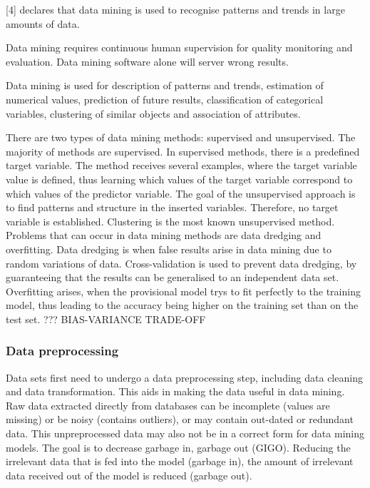 \textcite{DataMiningAndPredictiveAnalytics}[4] declares that data mining is used to recognise patterns and trends in large amounts of data.

Data mining requires continuous human supervision for quality monitoring and evaluation. Data mining software alone will server wrong results.

Data mining is used for description of patterns and trends, estimation of numerical values, prediction of future results, classification of categorical variables, clustering of similar objects and association of attributes.


There are two types of data mining methods: supervised and unsupervised.
The majority of methods are supervised. In supervised methods, there is a predefined target variable. The method receives several examples, where the target variable value is defined, thus learning which values of the target variable correspond to which values of the predictor variable.
The goal of the unsupervised approach is to find patterns and structure in the inserted variables. Therefore, no target variable is established. Clustering is the most known unsupervised method.
Problems that can occur in data mining methods are data dredging and overfitting. Data dredging is when false results arise in data mining due to random variations of data. Cross-validation is used to prevent data dredging, by guaranteeing that the results can be generalised to an independent data set. %
Overfitting arises, when the provisional model trys to fit perfectly to the training model, thus leading to the accuracy being higher on the training set than on the test set. ???
BIAS-VARIANCE  TRADE-OFF


\subsubsection{Data preprocessing}
Data sets first need to undergo a data preprocessing step, including data cleaning and data transformation. This aids in making the data useful in data mining. Raw data extracted directly from databases can be incomplete (values are missing) or be noisy (contains outliers), or may contain out-dated or redundant data. This unpreprocessed data may also not be in a correct form for data mining models. The goal is to decrease garbage in, garbage out (GIGO). Reducing the irrelevant data that is fed into the model (garbage in), the amount of irrelevant data received out of the model is reduced (garbage out).

